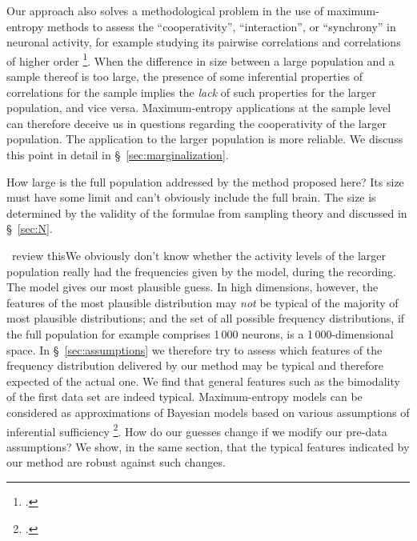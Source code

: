 \documentclass[\ifafour a4paper,12pt,\else a5paper,10pt,\fi%
onecolumn,oneside,article,%
british%
]{memoir}
\theoremstyle{remark}
\theoremstyle{innote}
\newcommand*{\citep}{\footcites}
\renewcommand*{\|}{\nonscript\,\vert\nonscript\;\mathopen{}}
\newcommand*{\sect}{\S}%
\newcommand*{\puzzle}{{\fontencoding{U}\fontfamily{fontawesometwo}\selectfont\symbol{225}}}
\newcommand{\mynote}[1]{ {\color{notecolour}\puzzle\ #1}}
\newcommand*{\dob}{degree of belief}
\begin{document}
Our approach also solves a methodological problem in the use of
maximum-entropy methods to assess the \enquote{cooperativity},
\enquote{interaction}, or \enquote{synchrony} in neuronal activity, for
example studying its pairwise correlations and correlations of higher order
\citep[see for
example][]{martignonetal1995,bohteetal2000,schneidmanetal2006,shlensetal2006,barreiroetal2010,ganmoretal2011,granotatedgietal2013}.
When the difference in size between a large population and a sample thereof
is too large, the presence of some inferential properties of correlations
for the sample implies the \emph{lack} of such properties for the larger
population, and vice versa. Maximum-entropy applications at the sample
level can therefore deceive us in questions regarding the cooperativity of
the larger population. The application to the larger population is more
reliable. We discuss this point in detail in
\sect~\ref{sec:marginalization}.



How large is the full population addressed by the method proposed here? Its
size must have some limit and can't obviously include the full brain. The
size is determined by the validity of the formulae from sampling theory and
discussed in \sect~\ref{sec:N}.

\mynote{review this}We obviously don't know whether the activity levels of
the larger population really had the frequencies given by the model, during
the recording. The model gives our most plausible guess. In high
dimensions, however, the features of the most plausible distribution may
\emph{not} be typical of the majority of most plausible distributions; and
the set of all possible frequency distributions, if the full population for
example comprises 1\,000 neurons, is a 1\,000-dimensional space. In
\sect~\ref{sec:assumptions} we therefore try to assess which features of
the frequency distribution delivered by our method may be typical and
therefore expected of the actual one. We find that general features such as
the bimodality of the first data set are indeed typical. Maximum-entropy
models can be considered as approximations of Bayesian models based on
various assumptions of inferential sufficiency
\citep{jaynes1986d_r1996,portamana2017}. How do our guesses change if we
modify our pre-data assumptions? We show, in the same section, that the
typical features indicated by our method are robust against such changes.
\end{document}
